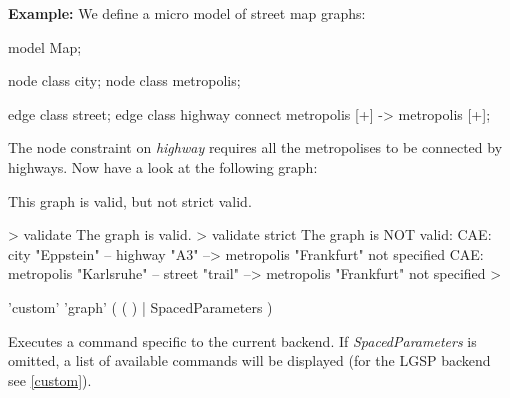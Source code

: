 {\small \textbf{Example:} We define a micro model of street map graphs:
\begin{grgen} 
model Map;

node class city;
node class metropolis;

edge class street;
edge class highway
      connect metropolis [+] -> metropolis [+];
\end{grgen}
The node constraint on \emph{highway} requires all the metropolises to be connected by highways. Now have a look at the following graph:
\begin{center}
\end{center}

This graph is valid, but not strict valid.
\begin{grshell} 
> validate
The graph is valid.
> validate strict
The graph is NOT valid:
  CAE: city "Eppstein" -- highway "A3" --> metropolis 
            "Frankfurt" not specified
  CAE: metropolis "Karlsruhe" -- street "trail" --> 
            metropolis "Frankfurt" not specified
>
\end{grshell}}

\begin{rail}
  'custom' 'graph' ( ( ) | SpacedParameters )
\end{rail}
Executes a command specific to the current backend. If \emph{SpacedParameters} is omitted, a list of available commands will be displayed (for the LGSP backend see \ref{custom}).

